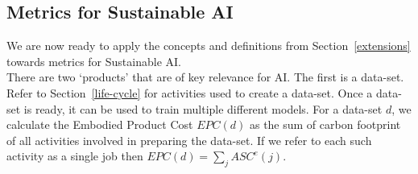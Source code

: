 \subsection{Metrics for Sustainable AI} 
\label{application}
We are now ready to apply the concepts and definitions from Section~\ref{extensions} towards metrics for Sustainable AI. 
\\
There are two `products' that are of key relevance for AI. 
The first is a data-set. Refer to Section~\ref{life-cycle} for activities used to create a data-set. 
Once a data-set is ready, it can be used to train multiple different models.
For a data-set $d$, we calculate the Embodied Product Cost $EPC(d)$ as the sum of carbon footprint of all activities involved in preparing the data-set. If we refer to each such activity as a single job then $EPC(d) = \sum_j ASC^e(j)$. 
\\
